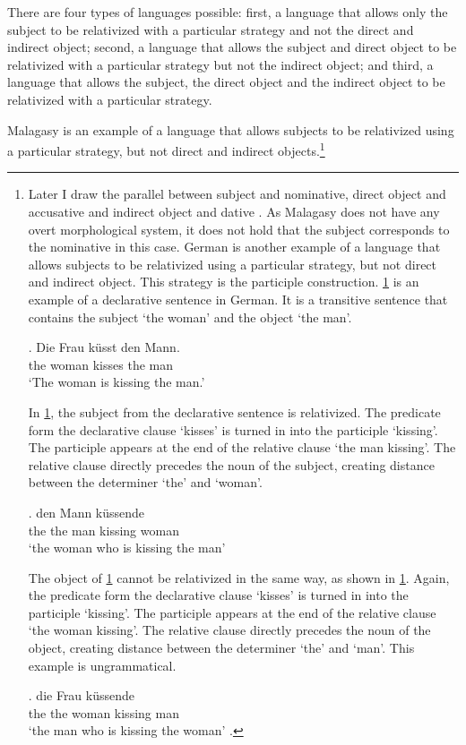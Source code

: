 There are four types of languages possible: first, a language that allows only the subject to be relativized with a particular strategy and not the direct and indirect object; second, a language that allows the subject and direct object to be relativized with a particular strategy but not the indirect object; and third, a language that allows the subject, the direct object and the indirect object to be relativized with a particular strategy.

Malagasy is an example of a language that allows subjects to be relativized using a particular strategy, but not direct and indirect objects.\footnote{
Later I draw the parallel between subject and nominative, direct object and accusative and indirect object and dative \citep[after][]{caha2009}. As Malagasy does not have any overt morphological system, it does not hold that the subject corresponds to the nominative in this case.
German is another example of a language that allows subjects to be relativized using a particular strategy, but not direct and indirect object. This strategy is the participle construction. \ref{ex:german-rel-decl} is an example of a declarative sentence in German. It is a transitive sentence that contains the subject  `the woman' and the object  `the man'.

\exg. Die Frau küsst den Mann.\\
the woman kisses the man\\
`The woman is kissing the man.' \label{ex:german-rel-decl}

In \ref{ex:german-rel-subj}, the subject from the declarative sentence is relativized. The predicate form the declarative clause  `kisses' is turned in into the participle  `kissing'. The participle appears at the end of the relative clause  `the man kissing'. The relative clause directly precedes the noun of the subject, creating distance between the determiner  `the' and  `woman'.

\exg.  den Mann küssende \\
 the the man kissing woman\\
 `the woman who is kissing the man' \label{ex:german-rel-subj}

The object of \ref{ex:german-rel-decl} cannot be relativized in the same way, as shown in \ref{ex:german-rel-no-do}. Again, the predicate form the declarative clause  `kisses' is turned in into the participle  `kissing'. The participle appears at the end of the relative clause  `the woman kissing'. The relative clause directly precedes the noun of the object, creating distance between the determiner  `the' and  `man'. This example is ungrammatical.

\exg.  die Frau küssende \\
 the the woman kissing man\\
 `the man who is kissing the woman' \label{ex:german-rel-no-do}
\z.

\phantom{x}}

